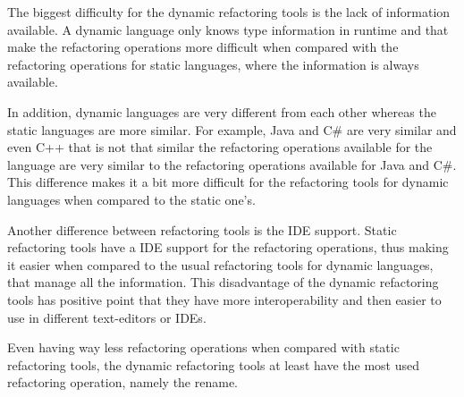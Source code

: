 The biggest difficulty for the dynamic refactoring tools is the lack of information available. A dynamic language only knows type information in runtime and that make the refactoring operations more difficult when compared with the refactoring operations for static languages, where the information is always available.

In addition, dynamic languages are very different from each other whereas the static languages are more similar. 
For example, Java and C\# are very similar and even C++ that is not that similar the refactoring operations available for the language are very similar to the refactoring operations available for Java and C\#. 
This difference makes it a bit more difficult for the refactoring tools for dynamic languages when compared to the static one's. %

Another difference between refactoring tools is the IDE support. Static refactoring tools have a IDE support for the refactoring operations, thus making it easier when compared to the usual refactoring tools for dynamic languages, that manage all the information. This disadvantage of the dynamic refactoring tools has positive point that they have more interoperability and then easier to use in different text-editors or IDEs.

Even having way less refactoring operations when compared with static refactoring tools, the dynamic refactoring tools at least have the most used refactoring operation, namely the rename.




